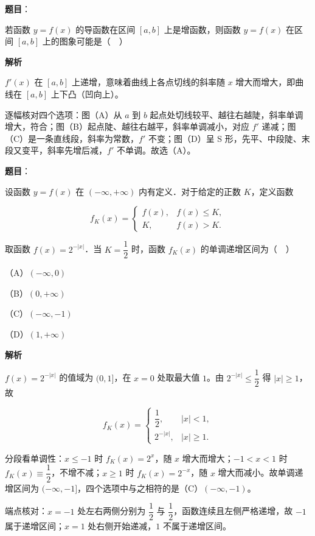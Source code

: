 \begin{answer}

\textbf{题目}：

若函数 $y=f(x)$ 的导函数在区间 $[a,b]$ 上是增函数，则函数 $y=f(x)$ 在区间 $[a,b]$ 上的图象可能是（　）
\nopagebreak[4]
\begin{center}\end{center}
\nopagebreak[4]
\textbf{解析}

$f'(x)$ 在 $[a,b]$ 上递增，意味着曲线上各点切线的斜率随 $x$ 增大而增大，即曲线在 $[a,b]$ 上下凸（凹向上）。

逐幅核对四个选项：图（A）从 $a$ 到 $b$ 起点处切线较平、越往右越陡，斜率单调增大，符合；图（B）起点陡、越往右越平，斜率单调减小，对应 $f'$ 递减；图（C）是一条直线段，斜率为常数，$f'$ 不变；图（D）呈 S 形，先平、中段陡、末段又变平，斜率先增后减，$f'$ 不单调。故选（A）。


\end{answer}
\begin{answer}

\textbf{题目}：

设函数 $y=f(x)$ 在 $(-\infty,+\infty)$ 内有定义．对于给定的正数 $K$，定义函数

\nopagebreak[4]
\[f_K(x)=\begin{cases}f(x), & f(x)\leqslant K,\\ K, & f(x)>K.\end{cases}\]

取函数 $f(x)=2^{-|x|}$．当 $K=\dfrac12$ 时，函数 $f_K(x)$ 的单调递增区间为（　）

（A）$(-\infty,0)$

（B）$(0,+\infty)$

（C）$(-\infty,-1)$

（D）$(1,+\infty)$

\textbf{解析}

$f(x)=2^{-|x|}$ 的值域为 $(0,1]$，在 $x=0$ 处取最大值 $1$。由 $2^{-|x|}\leqslant\dfrac12$ 得 $|x|\geqslant1$，故

\nopagebreak[4]
\[f_K(x)=\begin{cases}\dfrac12, & |x|<1,\\ 2^{-|x|}, & |x|\geqslant1.\end{cases}\]

分段看单调性：$x\leqslant-1$ 时 $f_K(x)=2^{x}$，随 $x$ 增大而增大；$-1<x<1$ 时 $f_K(x)\equiv\dfrac12$，不增不减；$x\geqslant1$ 时 $f_K(x)=2^{-x}$，随 $x$ 增大而减小。故单调递增区间为 $(-\infty,-1]$，四个选项中与之相符的是（C）$(-\infty,-1)$。

端点核对：$x=-1$ 处左右两侧分别为 $\dfrac12$ 与 $\dfrac12$，函数连续且左侧严格递增，故 $-1$ 属于递增区间；$x=1$ 处右侧开始递减，$1$ 不属于递增区间。


\end{answer}
